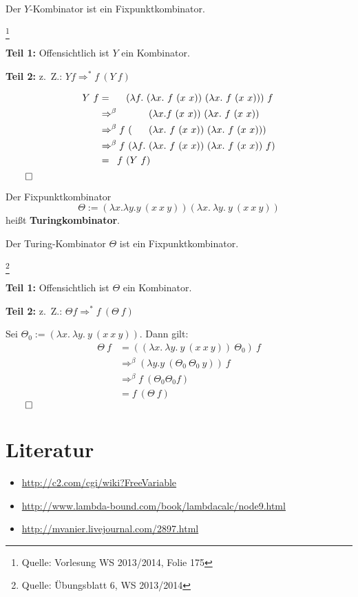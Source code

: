 \begin{behauptung}
    Der $Y$-Kombinator ist ein Fixpunktkombinator.
\end{behauptung}

\begin{beweis}\footnote{Quelle: Vorlesung WS 2013/2014, Folie 175}\leavevmode

    \textbf{Teil 1:} Offensichtlich ist $Y$ ein Kombinator.

    \textbf{Teil 2:} z.~Z.: $Y f \Rightarrow^* f \ (Y \ f)$

    \begin{align*}
        Y\ f     &=\hphantom{^\beta f\ } (\lambda f.\ (\lambda x.\ f\ (x\ x))\ (\lambda x.\ f\ (x\ x)))\ f\\
                 &\Rightarrow^\beta\hphantom{f \ (\lambda f.\ }  (\lambda x. f\ (x\ x))\ (\lambda x.\ f\ (x\ x))\\
                 &\Rightarrow^\beta  f \ (\hphantom{\lambda f.\ }(\lambda x.\ f\ (x\ x))\ (\lambda x.\ f\ (x\ x)))\\
                 &\Rightarrow^\beta  f \ (\lambda f.\ (\lambda x.\ f\ (x\ x))\ (\lambda x.\ f\ (x\ x))\ f)\\
                 &=\hphantom{^\beta} f \ (Y \ f)
    \end{align*}
    $\qed$
\end{beweis}

\begin{definition}[Turingkombinator]%
    Der Fixpunktkombinator
    \[\Theta := (\lambda x. \lambda y. y\ (x\ x\ y)) (\lambda x.\ \lambda y.\ y\ (x\ x\ y))\]
    heißt \textbf{Turingkombinator}.
\end{definition}

\begin{behauptung}
    Der Turing-Kombinator $\Theta$ ist ein Fixpunktkombinator.
\end{behauptung}

\begin{beweis}\footnote{Quelle: Übungsblatt 6, WS 2013/2014}

    \textbf{Teil 1:} Offensichtlich ist $\Theta$ ein Kombinator.

    \textbf{Teil 2:} z.~Z.: $\Theta f \Rightarrow^* f \ (\Theta \ f)$

    Sei $\Theta_0 := (\lambda x.\ \lambda y.\ y\ (x\ x\ y))$. Dann gilt:
    \begin{align*}
        \Theta\ f &= ((\lambda x.\ \lambda y.\ y\ (x\ x\ y))\ \Theta_0)\ f\\
                 &\Rightarrow^\beta (\lambda y. y\ (\Theta_0 \ \Theta_0 \ y))\ f\\
                 &\Rightarrow^\beta f \ (\Theta_0 \Theta_0 f)\\
                 &= f \ (\Theta \ f)
    \end{align*}
    $\qed$
\end{beweis}

\section{Literatur}

\begin{itemize}
    \item \url{http://c2.com/cgi/wiki?FreeVariable}
    \item \url{http://www.lambda-bound.com/book/lambdacalc/node9.html}
    \item \url{http://mvanier.livejournal.com/2897.html}
\end{itemize}